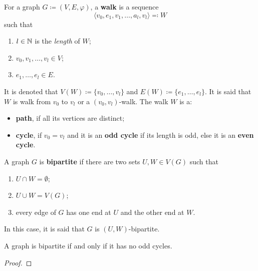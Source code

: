 \begin{definition}[Walk]
	\label{def:walk}
	For a graph \(G \coloneqq (V, E, \varphi)\), a \textbf{walk} is a sequence
	\[
		\langle v_0, e_1, v_1, \dots, a_l, v_l \rangle \eqqcolon W
	\]
	such that
	\begin{enumerate}[label=(\roman*)]
		\item \(l \in \mathbb{N}\) is the \textit{length} of \(W\);
		\item \(v_0, v_1, \dots, v_l \in V\);
		\item \(e_1, \dots, e_l \in E\).
	\end{enumerate}
	It is denoted that \(V(W) 
	\coloneqq \{v_0, \dots, v_l\}\) 
	and 
	\(E(W) \coloneqq \{e_1, \dots, e_l\}\). 
	It is said that \(W\) is walk from \(v_0\) to \(v_l\) or a \((v_0, v_l)\)-walk.
	The walk \(W\) is a:
	\begin{itemize}
		\item 
			\textbf{path}, if all its vertices are distinct;
		\item 
			\textbf{cycle}, if \(v_0 = v_l\) 
			and it is an \textbf{odd cycle} if its length is odd, else it is an \textbf{even cycle}.
	\end{itemize}
\end{definition}

\begin{definition}
	A graph \(G\) is \textbf{bipartite} if there are two sets \(U, W \in V(G)\) such that 
	\begin{enumerate}[label=(\roman*)]
		\item \(U \cap W = \emptyset\);
		\item \(U \cup W = V(G)\);
		\item every edge of \(G\) has one end at \(U\) and the other end at \(W\).
	\end{enumerate}
	In this case, it is said that \(G\) is \((U, W)\)-bipartite.
\end{definition}

\begin{theorem}
	A graph is bipartite if and only if it has no odd cycles.
\end{theorem}

\begin{proof}

\end{proof}

